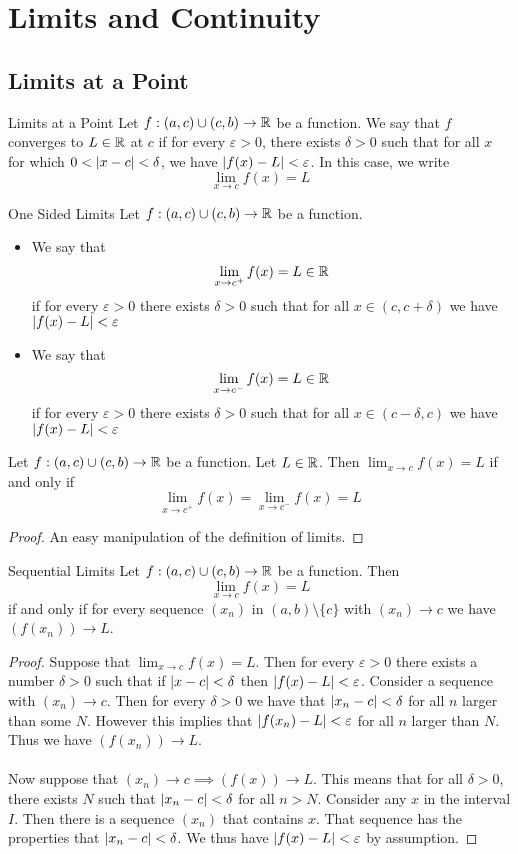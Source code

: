 \documentclass[a4paper]{article}
\begin{document}
\pagebreak
\section{Limits and Continuity}
\subsection{Limits at a Point}
\begin{defn}{Limits at a Point}{} Let $f:(a,c)\cup(c,b)\to\mathbb{R}$ be a function. We say that $f$ converges to $L\in\mathbb{R}$ at $c$ if for every $\varepsilon>0$, there exists $\delta>0$ such that for all $x$ for which $0<\abs{x-c}<\delta$, we have $\abs{f(x)-L}<\varepsilon$. In this case, we write $$\lim_{x\to c}f(x)=L$$
\end{defn}

\begin{defn}{One Sided Limits}{} Let $f:(a,c)\cup(c,b)\to\mathbb{R}$ be a function. 
\begin{itemize}
\item We say that $$\lim_{x\to c^+}f(x)=L\in\mathbb{R}$$ if for every $\varepsilon>0$ there exists $\delta>0$ such that for all $x\in(c,c+\delta)$ we have $\abs{f(x)-L}<\varepsilon$
\item We say that $$\lim_{x\to c^-}f(x)=L\in\mathbb{R}$$ if for every $\varepsilon>0$ there exists $\delta>0$ such that for all $x\in(c-\delta,c)$ we have $\abs{f(x)-L}<\varepsilon$
\end{itemize}
\end{defn}

\begin{lmm}{}{} Let $f:(a,c)\cup(c,b)\to\mathbb{R}$ be a function. Let $L\in\mathbb{R}$. Then $\lim_{x\to c}f(x)=L$ if and only if $$\lim_{x\to c^+}f(x)=\lim_{x\to c^-}f(x)=L$$ \tcbline
\begin{proof} An easy manipulation of the definition of limits. 
\end{proof}
\end{lmm}

\begin{thm}{Sequential Limits}{} Let $f:(a,c)\cup(c,b)\to\mathbb{R}$ be a function. Then $$\lim_{x\to c}f(x)=L$$ if and only if for every sequence $(x_n)$ in $(a,b)\setminus\{c\}$ with $(x_n)\to c$ we have $(f(x_n))\to L$. \tcbline
\begin{proof} Suppose that $\lim_{x\to c}f(x)=L$. Then for every $\varepsilon>0$ there exists a number $\delta>0$ such that if $\abs{x-c}<\delta$ then $\abs{f(x)-L}<\varepsilon$. Consider a sequence with $(x_n)\to c$. Then for every $\delta>0$ we have that $\abs{x_n-c}<\delta$ for all $n$ larger than some $N$. However this implies that $\abs{f(x_n)-L}<\varepsilon$ for all $n$ larger than $N$. Thus we have $(f(x_n))\to L$. \\~\\ 
Now suppose that $(x_n)\to c\implies (f(x))\to L$. This means that for all $\delta>0$, there exists $N$ such that $\abs{x_n-c}<\delta$ for all $n>N$. Consider any $x$ in the interval $I$. Then there is a sequence $(x_n)$ that contains $x$. That sequence has the properties that $\abs{x_n-c}<\delta$. We thus have $\abs{f(x)-L}<\varepsilon$ by assumption. 
\end{proof}
\end{thm}
\end{document}
